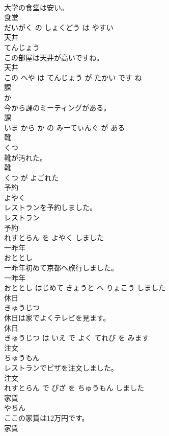\documentclass[8pt]{extreport}
\begin{document}
\begin{CJK}{UTF8}{min}
\\	大学の食堂は安い。	
\\	食堂 
\\	だいがく の しょくどう は やすい			
\\	天井	
\\	てんじょう			
\\	この部屋は天井が高いですね。	
\\	天井 
\\	この へや は てんじょう が たかい です ね			
\\	課	
\\	か			
\\	今から課のミーティングがある。	
\\	課 
\\	いま から か の みーてぃんぐ が ある			
\\	靴	
\\	くつ			
\\	靴が汚れた。	
\\	靴 
\\	くつ が よごれた			
\\	予約	
\\	よやく			
\\	レストランを予約しました。	
\\	レストラン 
\\	予約 
\\	れすとらん を よやく しました			
\\	一昨年	
\\	おととし			
\\	一昨年初めて京都へ旅行しました。	
\\	一昨年 
\\	おととし はじめて きょうと へ りょこう しました			
\\	休日	
\\	きゅうじつ			
\\	休日は家でよくテレビを見ます。	
\\	休日 
\\	きゅうじつ は いえ で よく てれび を みます			
\\	注文	
\\	ちゅうもん			
\\	レストランでピザを注文しました。	
\\	注文 
\\	れすとらん で ぴざ を ちゅうもん しました			
\\	家賃	
\\	やちん			
\\	ここの家賃は12万円です。	
\\	家賃 

\end{CJK}
\end{document}
